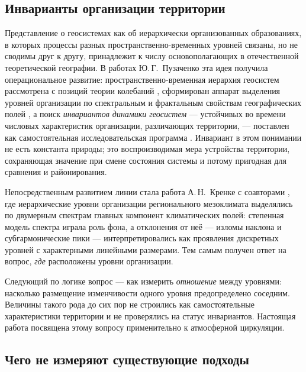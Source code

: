 \documentclass[11pt,a4paper]{article}
\begin{document}
\subsection{Инварианты организации территории}

Представление о геосистемах как об иерархически организованных образованиях, в которых процессы разных пространственно-временных уровней связаны, но не сводимы друг к другу, принадлежит к числу основополагающих в отечественной теоретической географии. В работах Ю.\,Г.~Пузаченко эта идея получила операциональное развитие: пространственно-временная иерархия геосистем рассмотрена с позиций теории колебаний \cite{Puzachenko1986}, сформирован аппарат выделения уровней организации по спектральным и фрактальным свойствам географических полей \cite{Puzachenko2004}, а поиск \emph{инвариантов динамики геосистем} --- устойчивых во времени числовых характеристик организации, различающих территории, --- поставлен как самостоятельная исследовательская программа \cite{Puzachenko2010}. Инвариант в этом понимании не есть константа природы; это воспроизводимая мера устройства территории, сохраняющая значение при смене состояния системы и потому пригодная для сравнения и районирования.

Непосредственным развитием линии стала работа А.\,Н.~Кренке с соавторами \cite{Krenke2019}, где иерархические уровни организации регионального мезоклимата выделялись по двумерным спектрам главных компонент климатических полей: степенная модель спектра играла роль фона, а отклонения от неё --- изломы наклона и субгармонические пики --- интерпретировались как проявления дискретных уровней с характерными линейными размерами. Тем самым получен ответ на вопрос, \emph{где} расположены уровни организации.

Следующий по логике вопрос --- как измерить \emph{отношение} между уровнями: насколько размещение изменчивости одного уровня предопределено соседним. Величины такого рода до сих пор не строились как самостоятельные характеристики территории и не проверялись на статус инвариантов. Настоящая работа посвящена этому вопросу применительно к атмосферной циркуляции.

\subsection{Чего не измеряют существующие подходы}
\end{document}

